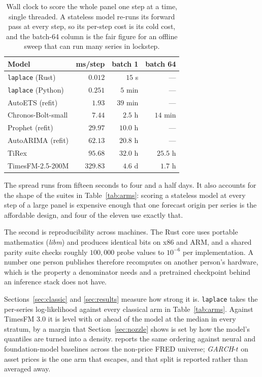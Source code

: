 \documentclass[article]{jss}
\providecommand{\proglang}[1]{\textsf{#1}}
\providecommand{\pkg}[1]{\textit{#1}}
\renewcommand{\pkg}[1]{\textit{#1}}
\providecommand{\code}[1]{\texttt{#1}}
\begin{document}
\begin{table}[t!]
\centering
\small
\begin{tabular}{lrrr}
\toprule
Model & ms/step & batch 1 & batch 64 \\
\midrule
\code{laplace} (\proglang{Rust})   & $0.012$   & $15$ s    & ---        \\
\code{laplace} (\proglang{Python}) & $0.251$   & $5$ min   & ---        \\
AutoETS (refit)                     & $1.93$    & $39$ min  & ---        \\
Chronos-Bolt-small                  & $7.44$    & $2.5$ h   & $14$ min   \\
Prophet (refit)                     & $29.97$   & $10.0$ h  & ---        \\
AutoARIMA (refit)                   & $62.13$   & $20.8$ h  & ---        \\
TiRex                               & $95.68$   & $32.0$ h  & $25.5$ h   \\
TimesFM-2.5-200M                    & $329.83$  & $4.6$ d   & $1.7$ h    \\
\bottomrule
\end{tabular}
\caption{Wall clock to score the whole panel one step at a time, single
threaded. A stateless model re-runs its forward pass at every step, so its
per-step cost is its cold cost, and the batch-64 column is the fair figure for
an offline sweep that can run many series in lockstep.}
\label{tab:panel}
\end{table}

The spread runs from fifteen seconds to four and a half days. It also accounts
for the shape of the suites in Table~\ref{tab:arms}: scoring a stateless model
at every step of a large panel is expensive enough that one forecast origin per
series is the affordable design, and four of the eleven use exactly that.

The second is reproducibility across machines. The \proglang{Rust} core uses
portable mathematics (\pkg{libm}) and produces identical bits on x86 and ARM,
and a shared parity suite checks roughly $100{,}000$ probe values to $10^{-6}$
per implementation. A number one person publishes therefore recomputes on
another person's hardware, which is the property a denominator needs and a
pretrained checkpoint behind an inference stack does not have.

Sections~\ref{sec:classic} and \ref{sec:results} measure how strong it is.
\code{laplace} takes the per-series log-likelihood against every classical arm
in Table~\ref{tab:arms}. Against TimesFM 3.0 it is level with or ahead of the
model at the median in every stratum, by a margin that Section~\ref{sec:nozzle}
shows is set by how the model's quantiles are turned into a density.
\citet{cotton2026transforms} reports the same ordering against neural and
foundation-model baselines across the non-price \proglang{FRED} universe;
\pkg{GARCH}-$t$ on asset prices is the one arm that escapes, and that split is
reported rather than averaged away.
\end{document}
